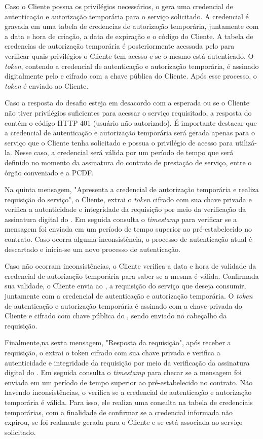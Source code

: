 Caso o Cliente possua os privilégios necessários, o \servidorAA{} gera uma credencial de autenticação e autorização temporária para o serviço solicitado. A credencial é gravada em uma tabela de credencias de autorização temporária, juntamente com a data e hora de criação, a data de expiração e o código do Cliente. A tabela de credencias de autorização temporária é posteriormente acessada pelo \servidorRest{} para verificar quais privilégios o Cliente tem acesso e se o mesmo está autenticado. O \emph{token}, contendo a credencial de autenticação e autorização temporária, é  assinado digitalmente pelo \servidorAA{} e cifrado  com a chave pública do Cliente. Após esse processo, o \emph{token} é enviado ao Cliente.

Caso a resposta do desafio esteja em desacordo com a esperada ou se o Cliente não tiver privilégios suficientes para acessar o serviço requisitado, a resposta do \servidorAA{} contém o código HTTP 401 (usuário não autorizado).
É importante destacar que a credencial de autenticação e autorização temporária será gerada apenas para o serviço que o Cliente tenha solicitado e possua o privilégio de acesso para utilizá-la. Nesse caso, a credencial será válida por um período  de tempo que será definido no momento da assinatura do contrato de prestação de serviço,
entre o órgão conveniado e a PCDF.

Na quinta mensagem, "Apresenta a credencial de autorização temporária e realiza requisição do serviço", o Cliente, extrai o \emph{token} cifrado com sua chave privada e verifica a autenticidade e integridade da requisição por meio da verificação da assinatura digital do \servidorAA. Em seguida consulta o \emph{timestamp} para verificar se a mensagem foi enviada em um período de tempo superior ao pré-estabelecido no contrato. Caso ocorra alguma inconsistência, o processo de autenticação atual é descartado e inicia-se um novo processo de autenticação.

Caso não ocorram inconsistências, o Cliente verifica a data e hora de validade da credencial de autorização temporária para saber se a mesma é válida. Confirmada sua validade, o Cliente envia ao \servidorRest{}, a requisição do serviço que deseja consumir, juntamente com a credencial de autenticação e autorização temporária. O \emph{token} de autenticação e autorização temporária é assinado com a chave privada do Cliente e cifrado com chave pública do \servidorRest{}, sendo enviado no cabeçalho da requisição.

Finalmente,na sexta mensagem, "Resposta da requisição", após receber a requisição, o \servidorRest{} extrai o token cifrado com sua chave privada e verifica a autenticidade e integridade da requisição por meio da verificação da assinatura digital do \servidorAA{}. Em seguida consulta o \emph{timestamp} para checar se a mensagem foi enviada em um período de tempo superior ao pré-estabelecido no contrato. Não havendo inconsistências, o \servidorRest{} verifica se a credencial de autenticação e autorização temporária é válida. Para isso, ele realiza uma consulta na tabela de credenciais temporárias, com a finalidade de confirmar se a credencial informada não expirou, se  foi realmente gerada para o Cliente e se está associada ao serviço solicitado.

